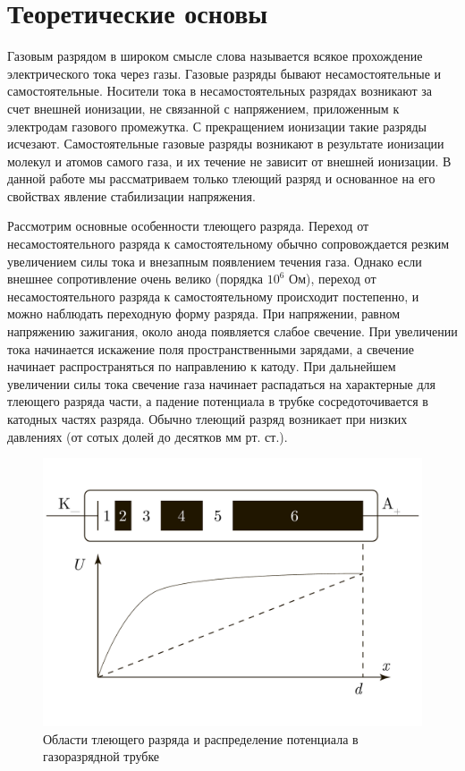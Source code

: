 \documentclass[a4paper, 12pt]{article}
\begin{document}
\section{Теоретические основы}
Газовым разрядом в широком смысле слова называется всякое прохождение электрического тока через газы. Газовые разряды бывают несамостоятельные и самостоятельные. Носители тока в несамостоятельных разрядах возникают за счет внешней ионизации, не связанной с напряжением, приложенным к электродам газового промежутка. С прекращением ионизации такие разряды исчезают. Самостоятельные газовые разряды возникают в результате ионизации молекул и атомов самого газа, и их течение не зависит от внешней ионизации. В данной работе мы рассматриваем только тлеющий разряд и основанное на его свойствах явление стабилизации напряжения.\par
Рассмотрим основные особенности тлеющего разряда. Переход от несамостоятельного разряда к самостоятельному обычно сопровождается резким увеличением силы тока и внезапным появлением течения газа. Однако если внешнее сопротивление очень велико (порядка $10^6$ Ом), переход от несамостоятельного разряда к самостоятельному происходит постепенно, и можно наблюдать переходную форму разряда. При напряжении, равном напряжению зажигания, около анода появляется слабое свечение. При увеличении тока начинается искажение поля пространственными зарядами, а свечение начинает распространяться по направлению к катоду. При дальнейшем увеличении силы тока свечение газа начинает распадаться на характерные для тлеющего разряда части, а падение потенциала в трубке сосредоточивается в катодных частях разряда. Обычно тлеющий разряд возникает при низких давлениях (от сотых долей до десятков мм рт. ст.).\par
\begin{figure}[h!]
	\centering
	\includegraphics[scale=0.4]{Graph7.pdf}
	\caption{Области тлеющего разряда и распределение потенциала в газоразрядной трубке}
	\label{fig:Graph7}
\end{figure}
\end{document}
